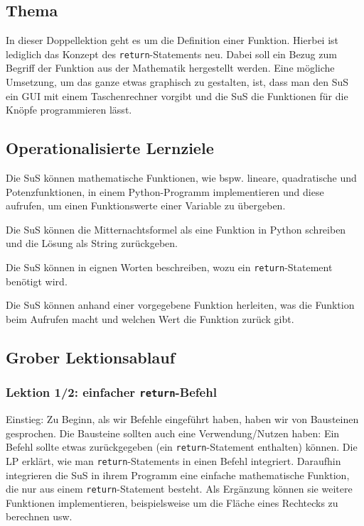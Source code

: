 \begin{myExBox}[title=DL \themycounter]
\subsection*{Thema}
In dieser Doppellektion geht es um die Definition einer Funktion. Hierbei ist lediglich das Konzept des \lstinline|return|-Statements neu. Dabei soll ein Bezug zum Begriff der Funktion aus der Mathematik hergestellt werden. Eine mögliche Umsetzung, um das ganze etwas graphisch zu gestalten, ist, dass man den SuS ein GUI mit einem Taschenrechner vorgibt und die SuS die Funktionen für die Knöpfe programmieren lässt.

\subsection*{Operationalisierte Lernziele}
\begin{todolist}
    \item Die SuS können mathematische Funktionen, wie bspw. lineare, quadratische und Potenzfunktionen, in einem Python-Programm implementieren und diese aufrufen, um einen Funktionswerte einer Variable zu übergeben.
    \item Die SuS können die Mitternachtsformel als eine Funktion in Python schreiben und die Lösung als String zurückgeben.
    \item Die SuS können in eignen Worten beschreiben, wozu ein \lstinline|return|-Statement benötigt wird.
    \item Die SuS können anhand einer vorgegebene Funktion herleiten, was die Funktion beim Aufrufen macht und welchen Wert die Funktion zurück gibt.
\end{todolist}

\subsection*{Grober Lektionsablauf}
\subsubsection*{Lektion 1/2: einfacher \lstinline|return|-Befehl}
Einstieg: Zu Beginn, als wir Befehle eingeführt haben, haben wir von Bausteinen gesprochen. Die Bausteine sollten auch eine Verwendung/Nutzen haben: Ein Befehl sollte etwas zurückgegeben (ein \lstinline|return|-Statement enthalten) können. Die LP erklärt, wie man \lstinline|return|-Statements in einen Befehl integriert. Daraufhin integrieren die SuS in ihrem Programm eine einfache mathematische Funktion, die nur aus einem \lstinline|return|-Statement besteht. Als Ergänzung können sie weitere Funktionen implementieren, beispielsweise um die Fläche eines Rechtecks zu berechnen usw. 


\end{myExBox}
